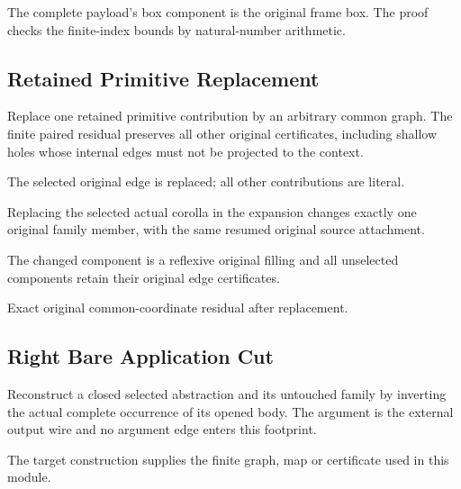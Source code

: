 The complete payload's box component is the original frame box.
The proof checks the finite-index bounds by natural-number arithmetic.
\par{}

\subsection{Retained Primitive Replacement}
Replace one retained primitive contribution by an arbitrary common graph.
The finite paired residual preserves all other original certificates, including
shallow holes whose internal edges must not be projected to the context.

The selected original edge is replaced; all other contributions are literal.
\par{}

Replacing the selected actual corolla in the expansion changes exactly
one original family member, with the same resumed original source attachment.
\par{}

The changed component is a reflexive original filling and all unselected
components retain their original edge certificates.
\par{}

Exact original common-coordinate residual after replacement.
\par{}

\subsection{Right Bare Application Cut}
Reconstruct a closed selected abstraction and its untouched family by
inverting the actual complete occurrence of its opened body. The argument
is the external output wire and no argument edge enters this footprint.

The target construction supplies the finite graph, map or certificate used in this module.
\par{}

